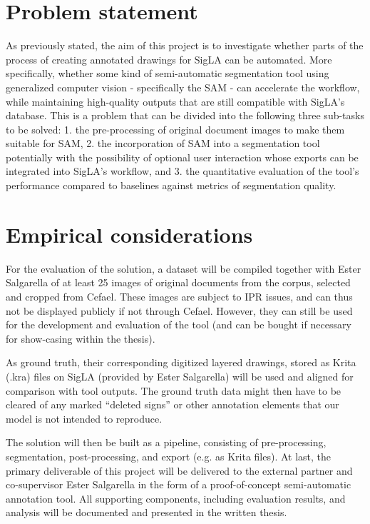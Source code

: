 \section{Problem statement}
As previously stated, the aim of this project is to investigate whether parts of the process of creating annotated drawings for SigLA can be automated.
More specifically, whether some kind of semi-automatic segmentation tool using generalized computer vision - specifically the \acf{SAM} - can accelerate the workflow, while maintaining high-quality outputs that are still compatible with SigLA’s database.
This is a problem that can be divided into the following three sub-tasks to be solved: 
1. the pre-processing of original document images to make them suitable for \acs{SAM},
2. the incorporation of \acs{SAM} into a segmentation tool potentially with the possibility of optional user interaction whose exports can be integrated into SigLA's workflow, and
3. the quantitative evaluation of the tool's performance compared to baselines against metrics of segmentation quality.

\section{Empirical considerations}
For the evaluation of the solution, a dataset will be compiled together with Ester Salgarella of at least 25 images of original 
documents from the corpus, selected and cropped from \acs{Cefael}.
These images are subject to \acf{IPR} issues, and can thus not be displayed publicly if not through \acs{Cefael}.
However, they can still be used for the development and evaluation of the tool (and can be bought if necessary for show-casing within the thesis).

As ground truth, their corresponding digitized layered drawings, stored as Krita (.kra) files on SigLA (provided by Ester Salgarella) will be used and aligned for comparison with tool outputs.
The ground truth data might then have to be cleared of any marked 
“deleted signs” or other annotation elements that our model is not intended to reproduce.

The solution will then be built as a pipeline, consisting of
pre-processing, segmentation, post-processing, and export (e.g. as Krita files).
At last, the primary deliverable of this project will be delivered to the external partner and co-supervisor Ester Salgarella in the form of a proof-of-concept semi-automatic annotation tool.
All supporting components, 
including evaluation results, and analysis will be documented and presented in the written 
thesis. 

